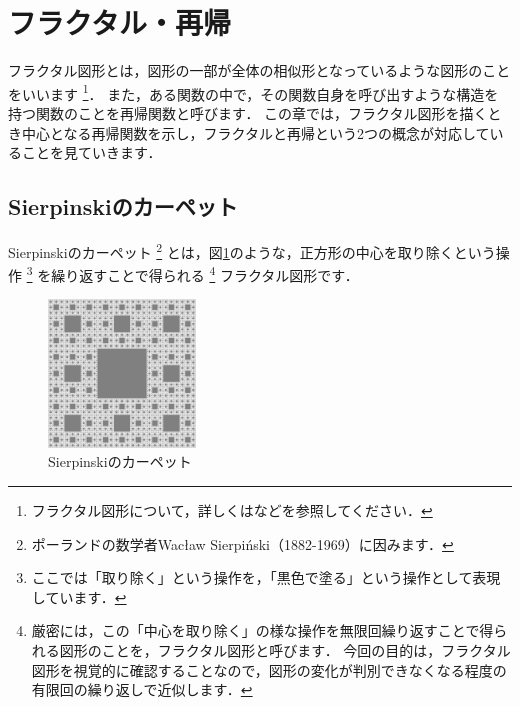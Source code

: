 \documentclass[dvipdfmx]{jsarticle}
\theoremstyle{definition}
\begin{document}
\section{フラクタル・再帰}  \label{sec_fractal_recursion}
フラクタル図形とは，図形の一部が全体の相似形となっているような図形のことをいいます
\footnote{
    フラクタル図形について，詳しくは\cite{fractal,fractal_1,fractal_2,chaosfractal}などを参照してください．
}．
また，ある関数の中で，その関数自身を呼び出すような構造を持つ関数のことを再帰関数と呼びます．
この章では，フラクタル図形を描くとき中心となる再帰関数を示し，フラクタルと再帰という2つの概念が対応していることを見ていきます．

\subsection{Sierpinskiのカーペット}  \label{subsec_carpet}
Sierpinskiのカーペット
\footnote{
    ポーランドの数学者Wac\l aw Sierpi\'nski（1882-1969）に因みます．
}
とは，図\ref{pic_carpet}のような，正方形の中心を取り除くという操作
\footnote{
    ここでは「取り除く」という操作を，「黒色で塗る」という操作として表現しています．
}
を繰り返すことで得られる
\footnote{
    厳密には，この「中心を取り除く」の様な操作を無限回繰り返すことで得られる図形のことを，フラクタル図形と呼びます．
    今回の目的は，フラクタル図形を視覚的に確認することなので，図形の変化が判別できなくなる程度の有限回の繰り返しで近似します．
}
フラクタル図形です．
%
\begin{figure}[H]
    \centering
    \includegraphics[width=0.35\textwidth]{figure/carpet/carpet.png}
    \caption{Sierpinskiのカーペット}
    \label{pic_carpet}
\end{figure}
\end{document}
